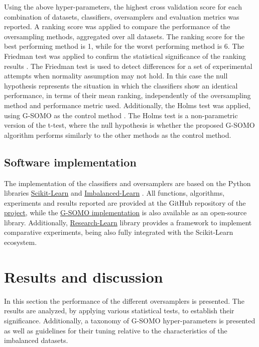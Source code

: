 \documentclass[parskip=full]{scrartcl}
\begin{document}
Using the above hyper-parameters, the highest cross validation score for each combination of datasets, classifiers, oversamplers and evaluation metrics was reported. A ranking score was applied to compare the performance of the oversampling methods, aggregated over all datasets. The ranking score for the best performing method is 1, while for the worst performing method is 6. The Friedman test was applied to confirm the statistical significance of the ranking results \cite{Guyon2003}. The Friedman test is used to detect differences for a set of experimental attempts when normality assumption may not hold. In this case the null hypothesis represents the situation in which the classifiers show an identical performance, in terms of their mean ranking, independently of the oversampling method and performance metric used. Additionally, the Holms test was applied, using G-SOMO as the control method \cite{Guyon2003}. The Holms test is a non-parametric version of the t-test, where the null hypothesis is whether the proposed G-SOMO algorithm performs similarly to the other methods as the control method.

\subsection{Software implementation}

The implementation of the classifiers and oversamplers are based on the Python libraries \href{https://scikit-learn.org/stable/}{Scikit-Learn} \cite{Pedregosa2012} and \href{https://imbalanced-learn.org/en/stable/}{Imbalanced-Learn} \cite{Lemaitre2016}. All functions, algorithms, experiments and results reported are provided at the GitHub repository of the \href{https://github.com/NOVA-IMS-Innovation-and-Analytics-Lab/publications}{project}, while the \href{https://github.com/AlgoWit/cluster-over-sampling}{ G-SOMO implementation} is also available as an open-source library. Additionally, \href{https://research-learn.readthedocs.io/en/latest/?badge=latest}{Research-Learn} library provides a framework to implement comparative experiments, being also fully integrated with the Scikit-Learn ecosystem.

\section{Results and discussion}

In this section the performance of the different oversamplers is presented. The results are analyzed, by applying various statistical tests, to establish their significance. Additionally, a taxonomy of G-SOMO hyper-parameters is presented as well as guidelines for their tuning relative to the characteristics of the imbalanced datasets.
\end{document}
